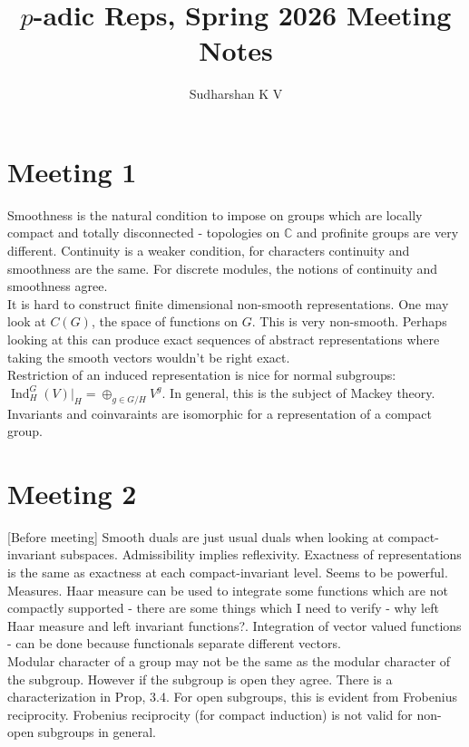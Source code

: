 \documentclass{amsart}
\title{$p$-adic Reps, Spring 2026 Meeting Notes}
\author{Sudharshan K V}
\numberwithin{equation}{section}
\theoremstyle{plain}
\theoremstyle{definition}
\theoremstyle{remark}
\newcommand{\osum}{\oplus}
\renewcommand{\_}[2]{\underbrace{#1}_{#2}}
\renewcommand{\^}[2]{\overbrace{#1}_{#2}}
\newcommand{\C}{\mathbb{C}}
\newcommand{\Ind}{\operatorname{Ind}}
\begin{document}
\maketitle

\section{Meeting 1}
Smoothness is the natural condition to impose on groups which are locally compact and totally disconnected - topologies on $\C$ and profinite groups are very different. Continuity is a weaker condition, for characters continuity and smoothness are the same. For discrete modules, the notions of continuity and smoothness agree.\\

It is hard to construct finite dimensional non-smooth representations. One may look at $C(G)$, the space of functions on $G$. This is very non-smooth. Perhaps looking at this can produce exact sequences of abstract representations where taking the smooth vectors wouldn't be right exact.\\

Restriction of an induced representation is nice for normal subgroups: $\Ind_H^G(V)|_H = \osum_{g\in G/H} V^g$. In general, this is the subject of Mackey theory. \\

Invariants and coinvaraints are isomorphic for a representation of a compact group.

\section{Meeting 2}
[Before meeting] Smooth duals are just usual duals when looking at compact-invariant subspaces. Admissibility implies reflexivity. Exactness of representations is the same as exactness at each compact-invariant level. Seems to be powerful.\\

Measures. Haar measure can be used to integrate some functions which are not compactly supported - there are some things which I need to verify - why left Haar measure and left invariant functions?. Integration of vector valued functions - can be done because functionals separate different vectors.\\

Modular character of a group may not be the same as the modular character of the subgroup. However if the subgroup is open they agree. There is a characterization in Prop, 3.4. For open subgroups, this is evident from Frobenius reciprocity. Frobenius reciprocity (for compact induction) is not valid for non-open subgroups in general.\\
\end{document}
